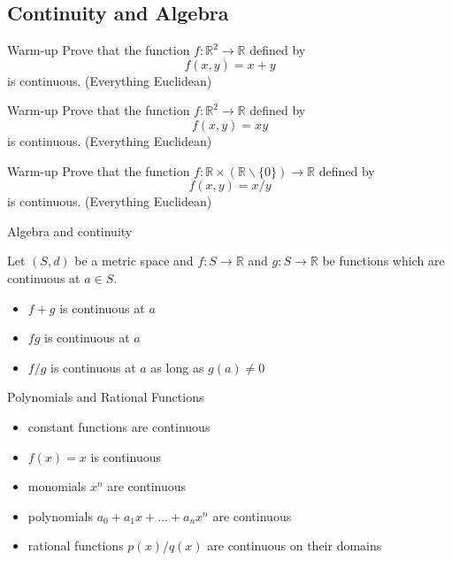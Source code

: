 \documentclass{beamer}
\begin{document}
\subsection{Continuity and Algebra}

\begin{frame}{Warm-up}
Prove that the function $f: \mathbb R^2\rightarrow\mathbb R$ defined by
$$f(x,y) = x+y$$
is continuous. (Everything Euclidean)
\end{frame}

\begin{frame}{Warm-up}
Prove that the function $f: \mathbb R^2\rightarrow\mathbb R$ defined by
$$f(x,y) = xy$$
is continuous. (Everything Euclidean)
\end{frame}

\begin{frame}{Warm-up}
Prove that the function $f: \mathbb R \times (\mathbb R\backslash\{0\})\rightarrow\mathbb R$ defined by
$$f(x,y) = x/y$$
is continuous. (Everything Euclidean)
\end{frame}

\begin{frame}{Algebra and continuity}
\begin{thm}
Let $(S,d)$ be a metric space and $f: S\rightarrow \mathbb{R}$ and $g: S\rightarrow\mathbb{R}$ be functions which are continuous at $a\in S$.
\begin{itemize}
\item $f+g$ is continuous at $a$
\item $fg$ is continuous at $a$
\item $f/g$ is continuous at $a$ as long as $g(a)\neq 0$
\end{itemize}
\end{thm}
\end{frame}

\begin{frame}{Polynomials and Rational Functions}
\begin{itemize}
\item constant functions are continuous
\item $f(x) = x$ is continuous
\item monomials $x^n$ are continuous
\item polynomials $a_0 + a_1x + \dots + a_nx^n$ are continuous
\item rational functions $p(x)/q(x)$ are continuous on their domains
\end{itemize}
\end{frame}
\end{document}
